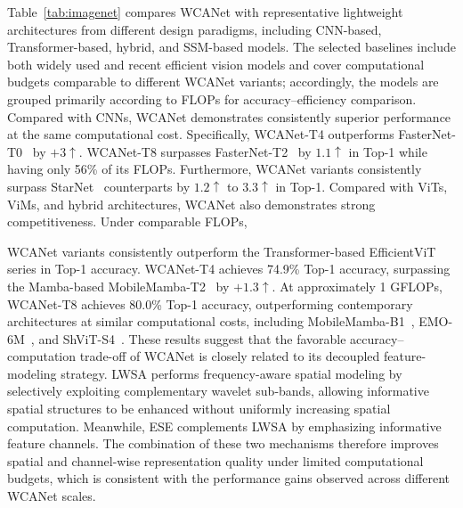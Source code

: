 \documentclass[a4paper,fleqn]{cas-dc}
\begin{document}
{\color{blue}
Table~\ref{tab:imagenet} compares WCANet with representative lightweight architectures from different design paradigms, including CNN-based, Transformer-based, hybrid, and SSM-based models. The selected baselines include both widely used and recent efficient vision models and cover computational budgets comparable to different WCANet variants; accordingly, the models are grouped primarily according to FLOPs for accuracy--efficiency comparison.
}
Compared with CNNs, WCANet demonstrates consistently superior performance at the same computational cost. Specifically, WCANet-T4 outperforms FasterNet-T0~\cite{chen2023run} by $+3\uparrow$. WCANet-T8 surpasses FasterNet-T2~\cite{chen2023run} by $1.1\uparrow$ in Top-1 while having only 56\% of its FLOPs. Furthermore, WCANet variants consistently surpass StarNet~\cite{ma2024rewrite} counterparts by $1.2\uparrow$ to $3.3\uparrow$ in Top-1. Compared with ViTs, ViMs, and hybrid architectures, WCANet also demonstrates strong competitiveness. Under comparable FLOPs, 


WCANet variants consistently outperform the Transformer-based EfficientViT~\cite{liu2023efficientvit} series in Top-1 accuracy. WCANet-T4 achieves 74.9\% Top-1 accuracy, surpassing the Mamba-based MobileMamba-T2~\cite{he2025mobilemamba} by $+1.3\uparrow$. At approximately 1 GFLOPs, WCANet-T8 achieves 80.0\% Top-1 accuracy, outperforming contemporary architectures at similar computational costs, including MobileMamba-B1~\cite{he2025mobilemamba}, EMO-6M~\cite{zhang2023rethinking}, and ShViT-S4~\cite{yun2024shvit}. 
{\color{blue}
These results suggest that the favorable accuracy--computation trade-off of WCANet is closely related to its decoupled feature-modeling strategy. LWSA performs frequency-aware spatial modeling by selectively exploiting complementary wavelet sub-bands, allowing informative spatial structures to be enhanced without uniformly increasing spatial computation. Meanwhile, ESE complements LWSA by emphasizing informative feature channels. The combination of these two mechanisms therefore improves spatial and channel-wise representation quality under limited computational budgets, which is consistent with the performance gains observed across different WCANet scales.
}
\end{document}
